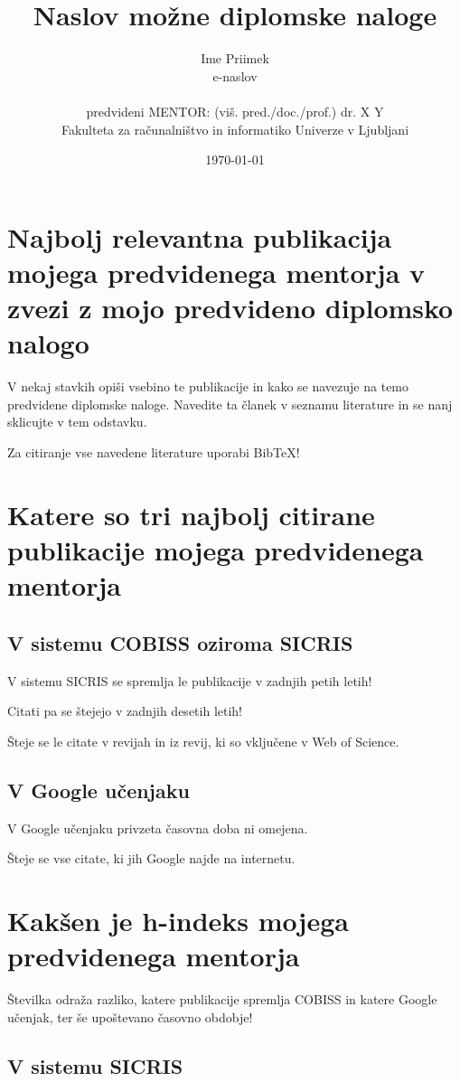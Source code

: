 \documentclass[11pt,a4paper]{article}
\title{Naslov možne diplomske naloge}
\author{Ime Priimek\\
e-naslov\\
\ \\
predvideni MENTOR: (viš. pred./doc./prof.) dr. X Y \\
Fakulteta za računalništvo in informatiko Univerze v Ljubljani
\date{\today}         
}
\begin{document}
\maketitle

\section{Najbolj relevantna publikacija mojega predvidenega mentorja v zvezi z mojo predvideno diplomsko nalogo}

V nekaj stavkih opiši vsebino te publikacije in kako se navezuje na temo predvidene diplomske naloge.
Navedite ta članek v seznamu literature in se nanj sklicujte v tem odstavku.

Za citiranje vse navedene literature uporabi  Bib\TeX!



\section{Katere so tri najbolj citirane publikacije mojega predvidenega mentorja}

\subsection{V sistemu COBISS oziroma SICRIS}

V sistemu SICRIS se spremlja le publikacije v zadnjih petih letih!

Citati pa se štejejo v zadnjih desetih letih!

Šteje se le citate v revijah in iz revij, ki so vključene v Web of Science.


\subsection{V Google učenjaku}

V Google učenjaku privzeta časovna doba ni omejena.

Šteje se vse citate, ki jih Google najde na internetu.


\section{Kakšen je h-indeks mojega predvidenega mentorja}

Številka odraža razliko, katere publikacije spremlja COBISS in katere Google učenjak, ter še upoštevano časovno obdobje!


\subsection{V sistemu SICRIS}
\end{document}
